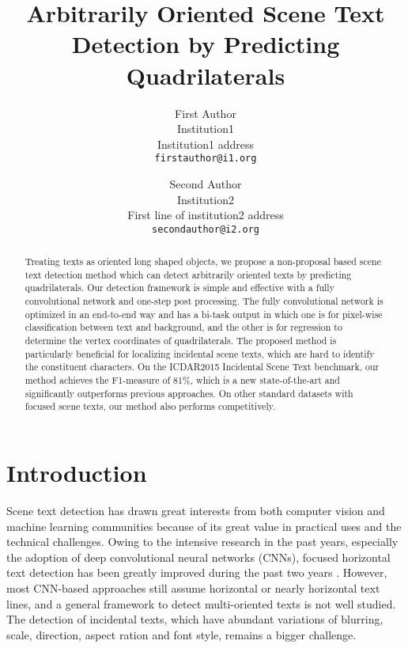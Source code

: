 \documentclass[10pt,twocolumn,letterpaper]{article}
\begin{document}
\title{Arbitrarily Oriented Scene Text Detection by Predicting Quadrilaterals}

\author{First Author\\
Institution1\\
Institution1 address\\
{\tt\small firstauthor@i1.org}
\and
Second Author\\
Institution2\\
First line of institution2 address\\
{\tt\small secondauthor@i2.org}
}

\maketitle

\begin{abstract}
	Treating texts as oriented long shaped objects, we propose a non-proposal based scene text detection method which can detect arbitrarily oriented texts by predicting quadrilaterals.
	Our detection framework is simple and effective with a fully convolutional network and one-step post processing.
	The fully convolutional network is optimized in an end-to-end way and has a bi-task output in which one is for pixel-wise classification between text and background, and the other is for regression to determine the vertex coordinates of quadrilaterals.
	The proposed method is particularly beneficial for localizing incidental scene texts, which are hard to identify the constituent characters. 
	On the ICDAR2015 Incidental Scene Text benchmark, our method achieves the F1-measure of 81\%, which is a new state-of-the-art and significantly outperforms previous approaches.
	On other standard datasets with focused scene texts, our method also performs competitively.
	
\end{abstract}

\section{Introduction}
	\label{Sec.1}
	
	Scene text detection has drawn great interests from both computer vision and machine learning communities because of its great value in practical uses and the technical challenges. 
	Owing to the intensive research in the past years, especially the adoption of deep convolutional neural networks (CNNs), focused horizontal text detection has been greatly improved during the past two years \cite{fcn-text} \cite{yolo-text} \cite{ctpn}.
	However, most CNN-based approaches still assume horizontal or nearly horizontal text lines, and a general framework to detect multi-oriented texts is not well studied. The detection of incidental texts, which have abundant variations of blurring, scale, direction, aspect ration and font style, remains a bigger challenge.
	
\end{document}
